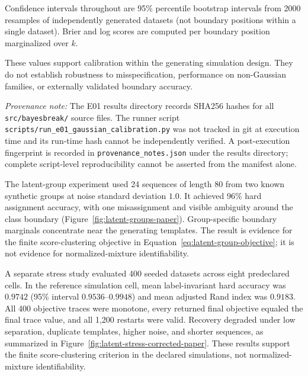 Confidence intervals throughout are 95\% percentile bootstrap intervals from 2000 resamples of independently generated datasets (not boundary positions within a single dataset). Brier and log scores are computed per boundary position marginalized over $k$.

These values support calibration within the generating simulation design. They do not establish robustness to misspecification, performance on non-Gaussian families, or externally validated boundary accuracy.

\textit{Provenance note:} The E01 results directory records SHA256 hashes for all \texttt{src/bayesbreak/} source files. The runner script \texttt{scripts/run\_e01\_gaussian\_calibration.py} was not tracked in git at execution time and its run-time hash cannot be independently verified. A post-execution fingerprint is recorded in \texttt{provenance\_notes.json} under the results directory; complete script-level reproducibility cannot be asserted from the manifest alone.







The latent-group experiment used 24 sequences of length 80 from two known synthetic groups at noise standard deviation $1.0$. It achieved 96\% hard assignment accuracy, with one misassignment and visible ambiguity around the class boundary (Figure~\ref{fig:latent-groups-paper}). Group-specific boundary marginals concentrate near the generating templates. The result is evidence for the finite score-clustering objective in Equation~\eqref{eq:latent-group-objective}; it is not evidence for normalized-mixture identifiability.



A separate stress study evaluated 400 seeded datasets across eight predeclared cells. In the reference simulation cell, mean label-invariant hard accuracy was $0.9742$ (95\% interval $0.9536$--$0.9948$) and mean adjusted Rand index was $0.9183$. All 400 objective traces were monotone, every returned final objective equaled the final trace value, and all 1,200 restarts were valid. Recovery degraded under low separation, duplicate templates, higher noise, and shorter sequences, as summarized in Figure~\ref{fig:latent-stress-corrected-paper}. These results support the finite score-clustering criterion in the declared simulations, not normalized-mixture identifiability.

